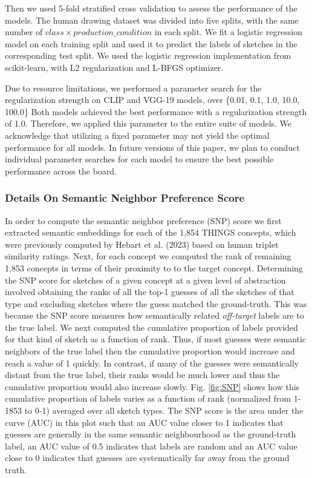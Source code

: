 \documentclass{article}
\begin{document}
Then we used 5-fold stratified cross validation to assess the performance of the models. The human drawing dataset was divided into five splits, with the same number of $class \times production\_condition$ in each split. We fit a logistic regression model on each training split and used it to predict the labels of sketches in the corresponding test split. We used the logistic regression implementation from scikit-learn, with L2 regularization and L-BFGS optimizer. 

Due to resource limitations, we performed a parameter search for the regularization strength on CLIP and VGG-19 models, over \{0.01, 0.1, 1.0, 10.0, 100.0\} Both models achieved the best performance with a regularization strength of 1.0. Therefore, we applied this parameter to the entire suite of models. We acknowledge that utilizing a fixed parameter may not yield the optimal performance for all models. In future versions of this paper, we plan to conduct individual parameter searches for each model to ensure the best possible performance across the board.

\subsubsection{Details On Semantic Neighbor Preference Score }
In order to compute the semantic neighbor preference (SNP) score we first extracted semantic embeddings for each of the 1,854 THINGS concepts, which were previously computed by Hebart et al. (2023) based on human triplet similarity ratings. Next, for each concept we computed the rank of remaining 1,853 concepts in terms of their proximity to to the target concept.
Determining the SNP score for sketches of a given concept at a given level of abstraction involved obtaining the ranks of all the top-1 guesses of all the sketches of that type and excluding sketches where the guess matched the ground-truth. This was because the SNP score measures how semantically related \textit{off-target} labels are to the true label. We next computed the cumulative proportion of labels provided for that kind of sketch as a function of rank. Thus, if most guesses were semantic neighbors of the true label then the cumulative proportion would increase and reach a value of 1 quickly. In contrast, if many of the guesses were semantically distant from the true label, their ranks would be much lower and thus the cumulative proportion would also increase slowly.
Fig. \ref{fig:SNP} shows how this cumulative proportion of labels varies as a function of rank (normalized from 1-1853 to 0-1) averaged over all sketch types. The SNP score is the area under the curve (AUC) in this plot such that an AUC value closer to 1 indicates that guesses are generally in the same semantic neighbourhood as the ground-truth label, an AUC value of 0.5 indicates that labels are random and an AUC value close to 0 indicates that guesses are systematically far away from the ground truth. 
\end{document}
